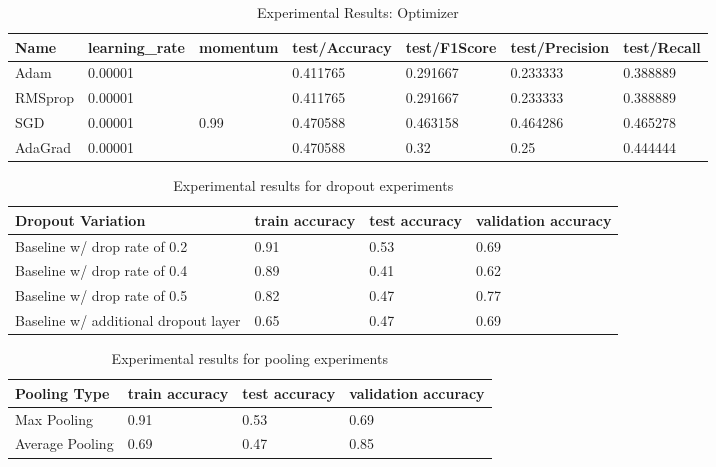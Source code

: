 \documentclass{article}
\begin{document}
\begin{table}[h!]
\caption{Experimental Results: Optimizer}
\label{table:optim}
\begin{tabular}{@{}lllllll@{}}
\toprule
Name    & learning\_rate & momentum & test/Accuracy & test/F1Score & test/Precision & test/Recall \\ \midrule
Adam    & 0.00001        &          & 0.411765      & 0.291667     & 0.233333       & 0.388889    \\
RMSprop & 0.00001        &          & 0.411765      & 0.291667     & 0.233333       & 0.388889    \\
SGD     & 0.00001        & 0.99     & 0.470588      & 0.463158     & 0.464286       & 0.465278    \\
AdaGrad & 0.00001        &          & 0.470588      & 0.32         & 0.25           & 0.444444  \\ 
\bottomrule
\end{tabular}
\end{table}

\begin{table}[h!]
    \centering    
    \caption{Experimental results for dropout experiments}
    \label{table:drop}
    \begin{tabular}{llll}
        \toprule
        \centering
        {Dropout Variation} & train accuracy & test accuracy & validation accuracy \\
        \midrule
         Baseline w/ drop rate of 0.2 & 0.91  & 0.53 & 0.69 \\
         Baseline w/ drop rate of 0.4  & 0.89 & 0.41 & 0.62  \\
         Baseline w/ drop rate of 0.5 & 0.82 & 0.47 & 0.77 \\
         Baseline w/ additional dropout layer & 0.65 & 0.47 & 0.69 \\
        \bottomrule
    \end{tabular}
\end{table}

\begin{table}[h!]
    \centering    
    \caption{Experimental results for pooling experiments}
    \label{table:pool}
    \begin{tabular}{llll}
        \toprule
        \centering
        {Pooling Type} & train accuracy & test accuracy & validation accuracy \\
        \midrule
         Max Pooling & 0.91  & 0.53 & 0.69 \\
         Average Pooling  & 0.69 & 0.47 & 0.85  \\
        \bottomrule
    \end{tabular}
\end{table}
\end{document}
